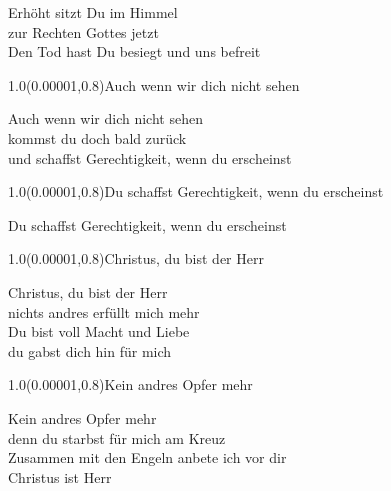 \documentclass[aspectratio=169]{beamer}
\begin{document}
\begin{frame}
\centering
\color{white}
\huge{Erhöht sitzt Du im Himmel} \\
\huge{zur Rechten Gottes jetzt} \\
\huge{Den Tod hast Du besiegt und uns befreit} \\

\begin{textblock}{1.0}(0.00001,0.8)\color{gray}\normalsize{Auch wenn wir dich nicht sehen}\end{textblock}
\end{frame}

\begin{frame}
\centering
\color{white}
\huge{Auch wenn wir dich nicht sehen} \\
\huge{kommst du doch bald zurück} \\
\huge{und schaffst Gerechtigkeit, wenn du erscheinst} \\

\begin{textblock}{1.0}(0.00001,0.8)\color{gray}\normalsize{Du schaffst Gerechtigkeit, wenn du erscheinst}\end{textblock}
\end{frame}

\begin{frame}
\centering
\color{white}
\huge{Du schaffst Gerechtigkeit, wenn du erscheinst} \\

\begin{textblock}{1.0}(0.00001,0.8)\color{gray}\normalsize{Christus, du bist der Herr}\end{textblock}
\end{frame}

\begin{frame}
\centering
\color{white}
\huge{Christus, du bist der Herr} \\
\huge{nichts andres erfüllt mich mehr} \\
\huge{Du bist voll Macht und Liebe} \\
\huge{du gabst dich hin für mich} \\

\begin{textblock}{1.0}(0.00001,0.8)\color{gray}\normalsize{Kein andres Opfer mehr}\end{textblock}
\end{frame}

\begin{frame}
\centering
\color{white}
\huge{Kein andres Opfer mehr} \\
\huge{denn du starbst für mich am Kreuz} \\
\huge{Zusammen mit den Engeln anbete ich vor dir} \\
\huge{Christus ist Herr} \\
\end{frame}
\end{document}
